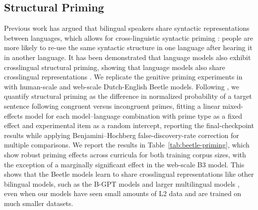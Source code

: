 \documentclass[11pt]{article}
\newcommand{\beetle}{Beetle} %
\begin{document}
\subsection{Structural Priming}\label{sec:structural-priming}
Previous work has argued that bilingual speakers share syntactic representations between languages, which allows for cross-linguistic syntactic priming \citep{hartsuiker2004crosslinguistic}: people are more likely to re-use the same syntactic structure in one language after hearing it in another language. It has been demonstrated that language models also exhibit crosslingual structural priming, showing that language models also share crosslingual representations \citep{michaelov-2023-structural,arnett-etal-2025-acquisition}. We replicate the genitive priming \citep{bernolet2013language}experiments in \citet{arnett-etal-2025-acquisition} with human-scale and web-scale Dutch-English \beetle{} models. Following \citet{arnett-etal-2025-acquisition}, we quantify structural priming as the difference in normalized probability of a target sentence following congruent versus incongruent primes, fitting a linear mixed-effects model for each model–language combination with prime type as a fixed effect and experimental item as a random intercept, reporting the final-checkpoint results while applying Benjamini–Hochberg false-discovery-rate correction for multiple comparisons.
We report the results in Table~\ref{tab:beetle-priming}, which show robust priming effects  across curricula for both training corpus sizes, with the exception of a marginally significant effect in the web-scale B3 model.
This shows that the \beetle{} models learn to share crosslingual representations like other bilingual models, such as the B-GPT models \citep{arnett-etal-2025-acquisition} and larger multilingual models \citep{michaelov-2023-structural}, even when our models have seen small amounts of L2 data and are trained on much smaller datasets.
\end{document}
